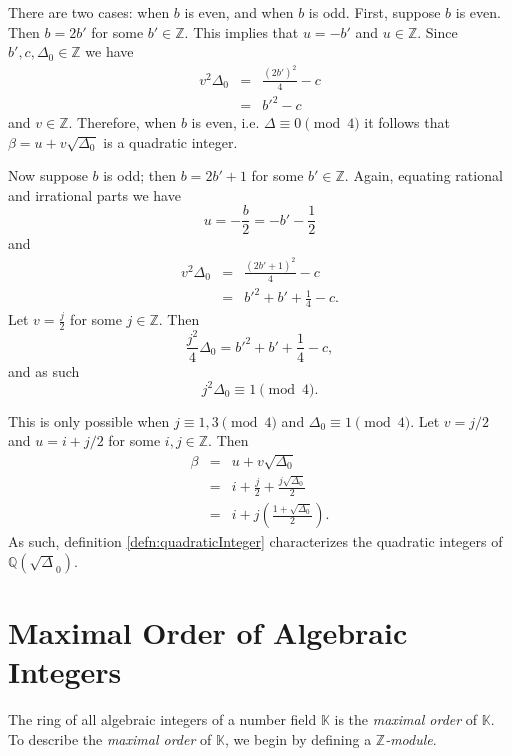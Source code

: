 \documentclass{ucalgthes1}
\theoremstyle{plain}
\theoremstyle{definition}
\newcommand{\KK}{\mathbb{K}}
\newcommand{\ZZ}{\mathbb{Z}}
\newcommand{\QQ}{\mathbb{Q}}
\begin{document}
There are two cases: when $b$ is even, and when $b$ is odd.  First, suppose $b$ is even.  Then $b=2b'$ for some $b' \in \ZZ$.  This implies that $u = -b'$ and $u \in \ZZ$.  Since $b', c, \Delta_0 \in \ZZ$ we have
\begin{eqnarray*}
	v^2 \Delta_0 & = & \frac{(2b')^2}{4} - c \\
	& = & b'^2 - c
\end{eqnarray*}
and $v \in \ZZ$.  Therefore, when $b$ is even, i.e. $\Delta \equiv 0 \pmod 4$ it follows that $\beta = u + v \sqrt{\Delta_0}$ is a quadratic integer.

\bigbreak
Now suppose $b$ is odd; then $b=2b' + 1$ for some $b' \in \ZZ$.  Again, equating rational and irrational parts we have
\[
	u = - \frac{b}{2} = -b' - \frac{1}{2}
\]
and
\begin{eqnarray*}
	v^2 \Delta_0 & = & \frac{(2b'+1)^2}{4} - c \\
	& = & b'^2 + b' + \frac{1}{4} -c.
\end{eqnarray*}
Let $v = \frac{j}{2}$ for some $j \in \ZZ$.  Then
\begin{equation*}
	\frac{j^2}{4} \Delta_0 = b'^2 + b' + \frac{1}{4} -c,
\end{equation*}
and as such
\begin{equation*}
	j^2 \Delta_0 \equiv 1 \pmod 4.
\end{equation*}

\noindent
This is only possible when $j \equiv 1,3 \pmod 4$ and $\Delta_0 \equiv 1 \pmod 4$.  Let $v = j/2$ and $u = i + j/2$ for some $i, j \in \ZZ$.  Then
\begin{eqnarray*}
	\beta & = & u + v \sqrt{\Delta_0} \\
	& = & i + \frac{j}{2} + \frac{j \sqrt{\Delta_0}}{2} \\
	& = & i + j \left( \frac{1 + \sqrt{\Delta_0}}{2} \right).
\end{eqnarray*}
As such, definition \ref{defn:quadraticInteger} characterizes the quadratic integers of $\QQ(\sqrt\Delta_0)$.



\bigbreak
\section{Maximal Order of Algebraic Integers}
The ring of all algebraic integers of a number field $\KK$ is the \emph{maximal order} of $\KK$.  To describe the \emph{maximal order} of $\KK$, we begin by defining a \emph{$\ZZ$-module}.  
\end{document}
